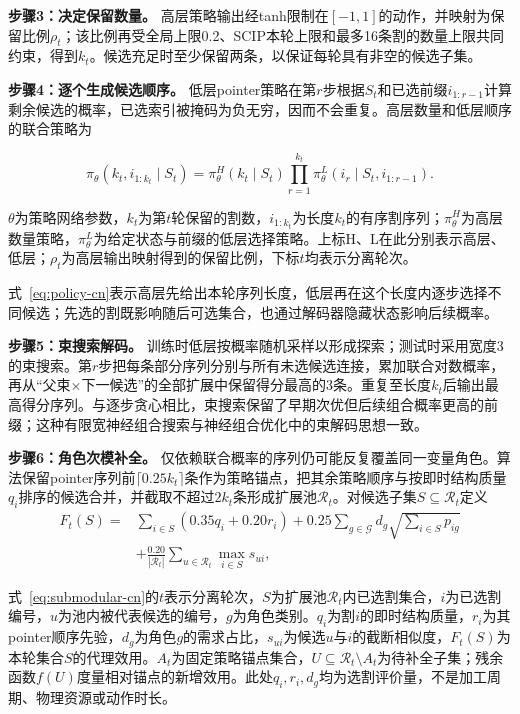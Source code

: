\documentclass[final,5p,times,twocolumn]{elsarticle}
\begin{document}
\noindent\textbf{步骤3：决定保留数量。} 高层策略输出经tanh限制在$[-1,1]$的动作，并映射为保留比例$\rho_t$；该比例再受全局上限0.2、SCIP本轮上限和最多16条割的数量上限共同约束，得到$k_t$。候选充足时至少保留两条，以保证每轮具有非空的候选子集。

\noindent\textbf{步骤4：逐个生成候选顺序。} 低层pointer策略在第$r$步根据$S_t$和已选前缀$i_{1:r-1}$计算剩余候选的概率，已选索引被掩码为负无穷，因而不会重复。高层数量和低层顺序的联合策略为

\begin{equation}
\pi_\theta(k_t,i_{1:k_t}\mid S_t)=\pi_\theta^H(k_t\mid S_t)
\prod_{r=1}^{k_t}\pi_\theta^L(i_r\mid S_t,i_{1:r-1}).
\label{eq:policy-cn}
\end{equation}

$\theta$为策略网络参数，$k_t$为第$t$轮保留的割数，$i_{1:k_t}$为长度$k_t$的有序割序列；$\pi_\theta^H$为高层数量策略，$\pi_\theta^L$为给定状态与前缀的低层选择策略。上标H、L在此分别表示高层、低层；$\rho_t$为高层输出映射得到的保留比例，下标$t$均表示分离轮次。


式~\eqref{eq:policy-cn}表示高层先给出本轮序列长度，低层再在这个长度内逐步选择不同候选；先选的割既影响随后可选集合，也通过解码器隐藏状态影响后续概率。

\noindent\textbf{步骤5：束搜索解码。} 训练时低层按概率随机采样以形成探索；测试时采用宽度3的束搜索。第$r$步把每条部分序列分别与所有未选候选连接，累加联合对数概率，再从“父束$\times$下一候选”的全部扩展中保留得分最高的3条。重复至长度$k_t$后输出最高得分序列。与逐步贪心相比，束搜索保留了早期次优但后续组合概率更高的前缀；这种有限宽神经组合搜索与神经组合优化中的束解码思想一致\citep{choo2022beam}。

\noindent\textbf{步骤6：角色次模补全。} 仅依赖联合概率的序列仍可能反复覆盖同一变量角色。算法保留pointer序列前$\lceil0.25k_t\rceil$条作为策略锚点，把其余策略顺序与按即时结构质量$q_i$排序的候选合并，并截取不超过$2k_t$条形成扩展池$\mathcal R_t$。对候选子集$S\subseteq\mathcal R_t$定义
\begin{equation}
\begin{aligned}
F_t(S)={}&\sum_{i\in S}(0.35q_i+0.20r_i)
+0.25\sum_{g\in\mathcal G}d_g\sqrt{\sum_{i\in S}p_{ig}}\\
&+\frac{0.20}{|\mathcal R_t|}\sum_{u\in\mathcal R_t}\max_{i\in S}s_{ui},
\end{aligned}
\label{eq:submodular-cn}
\end{equation}

式~\eqref{eq:submodular-cn}的$t$表示分离轮次，$S$为扩展池$\mathcal R_t$内已选割集合，$i$为已选割编号，$u$为池内被代表候选的编号，$g$为角色类别。$q_i$为割$i$的即时结构质量，$r_i$为其pointer顺序先验，$d_g$为角色$g$的需求占比，$s_{ui}$为候选$u$与$i$的截断相似度，$F_t(S)$为本轮集合$S$的代理效用。$A_t$为固定策略锚点集合，$U\subseteq\mathcal R_t\setminus A_t$为待补全子集；残余函数$f(U)$度量相对锚点的新增效用。此处$q_i,r_i,d_g$均为选割评价量，不是加工周期、物理资源或动作时长。
\end{document}
